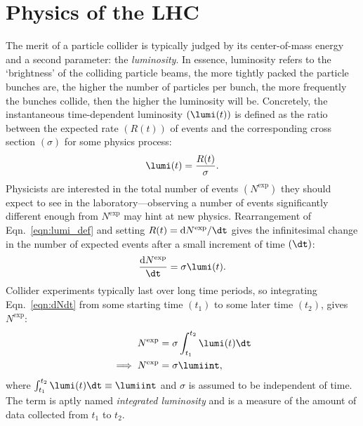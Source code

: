\section{Physics of the LHC}
The merit of a particle collider is typically judged by its center-of-mass energy and a second parameter: the \emph{luminosity}.
In essence, luminosity refers to the `brightness' of the colliding particle beams,
\ie the more tightly packed the particle bunches are, the higher the number of particles per bunch, the more frequently the bunches collide, then the higher the luminosity will be.
Concretely, the instantaneous time-dependent luminosity $(\lumi(t))$ is defined as the ratio between the expected rate $\left( R(t) \right)$ of events and the corresponding cross section $(\sigma)$ for some physics process:
\begin{equation}
    \lumi(t)= \frac{R(t)}{\sigma}.
    \label{eqn:lumi_def}
\end{equation}
Physicists are interested in the total number of events $\left( N^\text{exp} \right)$ they should expect to see in the laboratory---observing a number of events significantly different enough from $N^\text{exp}$ may hint at new physics.
Rearrangement of Eqn.~\ref{eqn:lumi_def} and setting $R(t) = \text{d}N^\text{exp} / \dt$ gives the infinitesimal change in the number of expected events after a small increment of time $(\dt)$:
\begin{equation}
    \frac{\text{d}N^\text{exp}}{\dt} = \sigma \lumi(t).
    \label{eqn:dNdt}
\end{equation}
Collider experiments typically last over long time periods, so integrating Eqn.~\ref{eqn:dNdt} from some starting time $\left( t_1 \right)$ to some later time $\left( t_2 \right)$, gives $N^\text{exp}$:
\begin{align*}
    N^\text{exp} &= \sigma \int_{t_1}^{t_2}{\lumi(t) \dt}
    \\
    \implies N^\text{exp} &= \sigma \lumiint,
    \label{eqn:Nexp}
\end{align*}
where $\int_{t_1}^{t_2}{\lumi(t) \dt} \equiv \lumiint$ and $\sigma$ is assumed to be independent of time.
The term \lumiint is aptly named \emph{integrated luminosity} and is a measure of the amount of data collected from $t_1$ to $t_2$.

